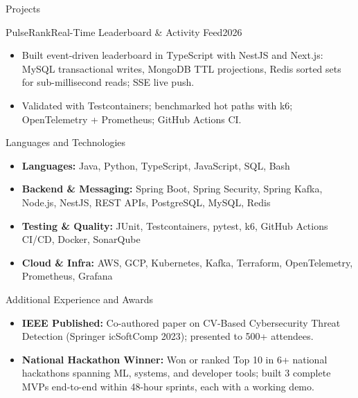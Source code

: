 \documentclass[]{mcdowellcv}
\begin{document}
\begin{cvsection}{Projects}
  \begin{cvsubsection}{PulseRank}{Real-Time Leaderboard \& Activity Feed}{2026}
    \begin{itemize}
      \item Built event-driven leaderboard in TypeScript with NestJS and Next.js: MySQL transactional writes, MongoDB TTL projections, Redis sorted sets for sub-millisecond reads; SSE live push.
      \item Validated with Testcontainers; benchmarked hot paths with k6; OpenTelemetry + Prometheus; GitHub Actions CI.
    \end{itemize}
  \end{cvsubsection}
\end{cvsection}

\begin{cvsection}{Languages and Technologies}
  \begin{cvsubsection}{}{}{}
    \begin{itemize}
      \item \textbf{Languages:} Java, Python, TypeScript, JavaScript, SQL, Bash
      \item \textbf{Backend \& Messaging:} Spring Boot, Spring Security, Spring Kafka, Node.js, NestJS, REST APIs, PostgreSQL, MySQL, Redis
      \item \textbf{Testing \& Quality:} JUnit, Testcontainers, pytest, k6, GitHub Actions CI/CD, Docker, SonarQube
      \item \textbf{Cloud \& Infra:} AWS, GCP, Kubernetes, Kafka, Terraform, OpenTelemetry, Prometheus, Grafana
    \end{itemize}
  \end{cvsubsection}
\end{cvsection}

\begin{cvsection}{Additional Experience and Awards}
  \begin{cvsubsection}{}{}{}
    \begin{itemize}
      \item \textbf{IEEE Published:} Co-authored paper on CV-Based Cybersecurity Threat Detection (Springer icSoftComp 2023); presented to 500+ attendees.
      \item \textbf{National Hackathon Winner:} Won or ranked Top 10 in 6+ national hackathons spanning ML, systems, and developer tools; built 3 complete MVPs end-to-end within 48-hour sprints, each with a working demo.
    \end{itemize}
  \end{cvsubsection}
\end{cvsection}
\end{document}
